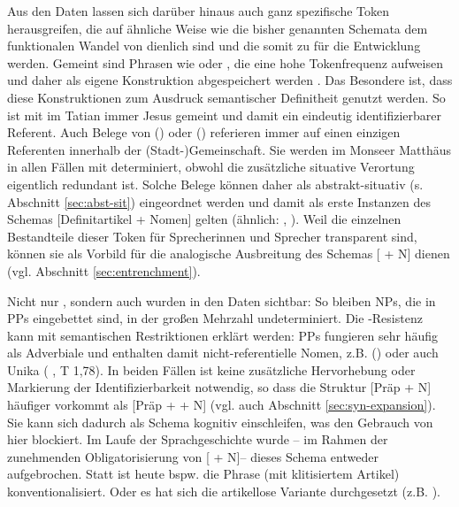 Aus den Daten lassen sich darüber hinaus auch ganz spezifische Token herausgreifen, die auf ähnliche Weise wie die bisher genannten Schemata dem funktionalen Wandel von  dienlich sind und die somit zu  für die Entwicklung werden. Gemeint sind Phrasen wie  oder , die eine hohe Tokenfrequenz aufweisen und daher als eigene Konstruktion abgespeichert werden \parencite[= Token-Entrenchment, s.][]{Ziem2013}. Das Besondere ist, dass diese Konstruktionen zum Ausdruck semantischer Definitheit genutzt werden. So ist mit   im Tatian immer Jesus gemeint und damit ein eindeutig identifizierbarer Referent. Auch Belege von   () oder   () referieren immer auf einen einzigen Referenten innerhalb der (Stadt-)Gemeinschaft. Sie werden im Monseer Matthäus in allen Fällen mit  determiniert, obwohl die zusätzliche situative Verortung eigentlich redundant ist. Solche Belege können daher als abstrakt-situativ (s. Abschnitt \ref{sec:abst-sit}) eingeordnet werden und damit als erste Instanzen des Schemas [Definitartikel + Nomen] gelten (ähnlich: , ). Weil die einzelnen Bestandteile dieser Token für Sprecherinnen und Sprecher transparent sind, können sie als Vorbild für die analogische Ausbreitung des Schemas [ + N] dienen (vgl. Abschnitt \ref{sec:entrenchment}). 

Nicht nur , sondern auch  wurden in den Daten sichtbar: So bleiben NPs, die in PPs eingebettet sind, in der großen Mehrzahl undeterminiert. Die -Resistenz kann mit semantischen Restriktionen erklärt werden: PPs fungieren sehr häufig als Adverbiale und enthalten damit nicht-referentielle Nomen, z.B.  () oder auch Unika ( , T 1,78). In beiden Fällen ist keine zusätzliche Hervorhebung oder Markierung der Identifizierbarkeit notwendig, so dass die Struktur [Präp + N] häufiger vorkommt als [Präp +  + N] (vgl. auch Abschnitt \ref{sec:syn-expansion}). Sie kann sich dadurch als Schema kognitiv einschleifen, was den Gebrauch von  hier blockiert. Im Laufe der Sprachgeschichte wurde -- im Rahmen der zunehmenden Obligatorisierung von [ + N]-- dieses Schema entweder aufgebrochen. Statt  ist heute bspw. die Phrase  (mit klitisiertem Artikel) konventionalisiert. Oder es hat sich die artikellose Variante durchgesetzt (z.B. ).
